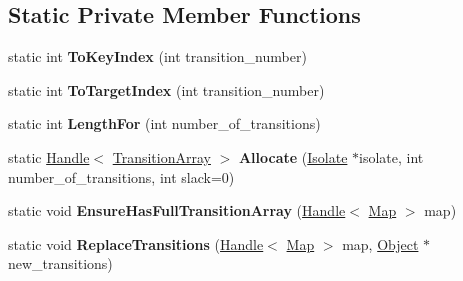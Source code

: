 \subsection*{Static Private Member Functions}
\begin{DoxyCompactItemize}
\item 
static int {\bfseries To\+Key\+Index} (int transition\+\_\+number)\hypertarget{classv8_1_1internal_1_1_transition_array_a1921e0066146c0dd4219d05e660e636b}{}\label{classv8_1_1internal_1_1_transition_array_a1921e0066146c0dd4219d05e660e636b}

\item 
static int {\bfseries To\+Target\+Index} (int transition\+\_\+number)\hypertarget{classv8_1_1internal_1_1_transition_array_aafbf4ba7c3804875dd67e1937dfc964e}{}\label{classv8_1_1internal_1_1_transition_array_aafbf4ba7c3804875dd67e1937dfc964e}

\item 
static int {\bfseries Length\+For} (int number\+\_\+of\+\_\+transitions)\hypertarget{classv8_1_1internal_1_1_transition_array_a32958075c11db90f1e789b070d898600}{}\label{classv8_1_1internal_1_1_transition_array_a32958075c11db90f1e789b070d898600}

\item 
static \hyperlink{classv8_1_1internal_1_1_handle}{Handle}$<$ \hyperlink{classv8_1_1internal_1_1_transition_array}{Transition\+Array} $>$ {\bfseries Allocate} (\hyperlink{classv8_1_1internal_1_1_isolate}{Isolate} $\ast$isolate, int number\+\_\+of\+\_\+transitions, int slack=0)\hypertarget{classv8_1_1internal_1_1_transition_array_afae7cd0ef9dc897aa7f70356f0a97297}{}\label{classv8_1_1internal_1_1_transition_array_afae7cd0ef9dc897aa7f70356f0a97297}

\item 
static void {\bfseries Ensure\+Has\+Full\+Transition\+Array} (\hyperlink{classv8_1_1internal_1_1_handle}{Handle}$<$ \hyperlink{classv8_1_1internal_1_1_map}{Map} $>$ map)\hypertarget{classv8_1_1internal_1_1_transition_array_ac84005d6e34f3837926fe3a20f2b1d3f}{}\label{classv8_1_1internal_1_1_transition_array_ac84005d6e34f3837926fe3a20f2b1d3f}

\item 
static void {\bfseries Replace\+Transitions} (\hyperlink{classv8_1_1internal_1_1_handle}{Handle}$<$ \hyperlink{classv8_1_1internal_1_1_map}{Map} $>$ map, \hyperlink{classv8_1_1internal_1_1_object}{Object} $\ast$new\+\_\+transitions)\hypertarget{classv8_1_1internal_1_1_transition_array_a1995faef4cd34e8a86ea7bf9bae66797}{}\label{classv8_1_1internal_1_1_transition_array_a1995faef4cd34e8a86ea7bf9bae66797}


\end{DoxyCompactItemize}
